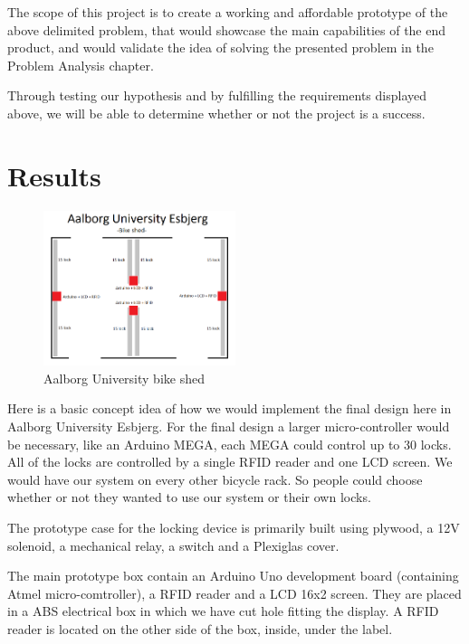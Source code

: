 \documentclass[twoside]{article}
\begin{document}
\begin{multicols}{2}
The scope of this project is to create a working and affordable prototype of the above delimited problem, that would showcase the main capabilities of the end product, and would validate the idea of solving the presented problem in the Problem Analysis chapter.

Through testing our hypothesis and by fulfilling the requirements displayed above, we will be able to determine whether or not the project is a success.


\section{Results}

\begin{figure}[H]
    \centering
    \includegraphics[width=0.5\textwidth]{./images/bikeshed.PNG}
    \caption{Aalborg University bike shed }
    \label{fig:bikeshed}
\end{figure}

Here is a basic concept idea of how we would implement the final design here in Aalborg University Esbjerg. For the final design a larger micro-controller would be necessary, like an Arduino MEGA, each MEGA could control up to 30 locks. All of the locks are controlled by a single RFID reader and one LCD screen. We would have our system on every other bicycle rack. So people could choose whether or not they wanted to use our system or their own locks.

The prototype case for the locking device is primarily built using plywood, a 12V solenoid, a mechanical relay, a switch and a Plexiglas cover.
 
The main prototype box contain an Arduino Uno development board (containing Atmel micro-comtroller), a RFID reader and a LCD 16x2 screen. They are placed in a ABS electrical box in which we have cut hole fitting the display. A RFID reader is located on the other side of the box, inside, under the label.


\end{multicols}
\end{document}
